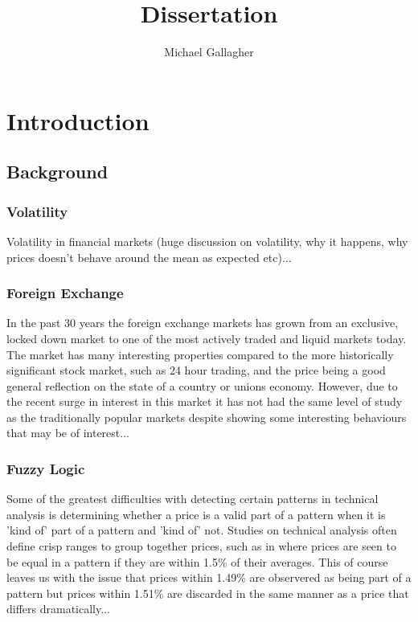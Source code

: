 \documentclass{article}
\title{Dissertation}
\author{Michael Gallagher}
\begin{document}
\maketitle

\tableofcontents

\section{Introduction}

\subsection{Background}

\subsubsection{Volatility}

Volatility in financial markets (huge discussion on volatility, why it happens, why prices doesn't behave around the mean as expected etc)...	

\subsubsection{Foreign Exchange}

In the past 30 years the foreign exchange markets has grown from an exclusive, locked down market to one of the most actively traded and liquid markets today. The market has many interesting properties compared to the more historically significant stock market, such as 24 hour trading, and the price being a good general reflection on the state of a country or unions economy. However, due to the recent surge in interest in this market it has not had the same level of study as the traditionally popular markets despite showing some interesting behaviours that may be of interest...

\subsubsection{Fuzzy Logic}

Some of the greatest difficulties with detecting certain patterns in technical analysis is determining whether a price is a valid part of a pattern when it is 'kind of' part of a pattern and 'kind of' not. Studies on technical analysis often define crisp ranges to group together prices, such as in \citep{foundations} where prices are seen to be equal in a pattern if they are within 1.5\% of their averages. This of course leaves us with the issue that prices within 1.49\% are observered as being part of a pattern but prices within 1.51\% are discarded in the same manner as a price that differs dramatically...
\end{document}
